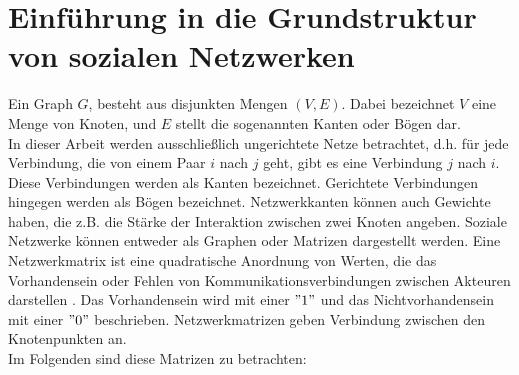 \section{Einführung in die Grundstruktur von sozialen Netzwerken}
Ein Graph $G$, besteht aus disjunkten Mengen $(V ,E)$. Dabei bezeichnet $V$ eine Menge von Knoten, und $E$ stellt die sogenannten Kanten oder Bögen dar.\\
In dieser Arbeit werden ausschließlich ungerichtete Netze betrachtet, d.h. für jede Verbindung, die von einem Paar $i$ nach $j$ geht, gibt es eine Verbindung $j$ nach $i$. Diese Verbindungen werden als Kanten bezeichnet. Gerichtete Verbindungen hingegen werden als Bögen bezeichnet. Netzwerkkanten können auch Gewichte haben, die z.B. die Stärke der Interaktion zwischen zwei Knoten angeben.
Soziale Netzwerke können entweder als Graphen oder Matrizen dargestellt werden. Eine Netzwerkmatrix ist eine quadratische Anordnung von Werten, die das Vorhandensein oder Fehlen von Kommunikationsverbindungen zwischen Akteuren darstellen \cite{Hanneman}. Das Vorhandensein wird mit einer $"1"$ und das Nichtvorhandensein mit einer $"0"$ beschrieben. Netzwerkmatrizen geben Verbindung zwischen den Knotenpunkten an. \\
Im Folgenden sind diese Matrizen zu betrachten: \\
 
